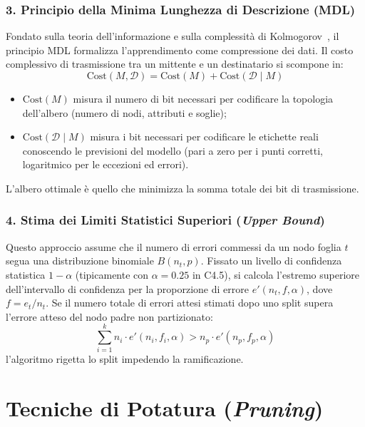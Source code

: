 \subsubsection{3. Principio della Minima Lunghezza di Descrizione (MDL)}
Fondato sulla teoria dell'informazione e sulla complessità di Kolmogorov~\cite{rissanen1978}, il principio MDL formalizza l'apprendimento come compressione dei dati. Il costo complessivo di trasmissione tra un mittente e un destinatario si scompone in:
\begin{equation}
    \text{Cost}(M, \mathcal{D}) = \text{Cost}(M) + \text{Cost}(\mathcal{D} \mid M)
\end{equation}
\begin{itemize}
    \item $\text{Cost}(M)$ misura il numero di bit necessari per codificare la topologia dell'albero (numero di nodi, attributi e soglie);
    \item $\text{Cost}(\mathcal{D} \mid M)$ misura i bit necessari per codificare le etichette reali conoscendo le previsioni del modello (pari a zero per i punti corretti, logaritmico per le eccezioni ed errori).
\end{itemize}
L'albero ottimale è quello che minimizza la somma totale dei bit di trasmissione.

\subsubsection{4. Stima dei Limiti Statistici Superiori (\textit{Upper Bound})}
Questo approccio assume che il numero di errori commessi da un nodo foglia $t$ segua una distribuzione binomiale $B(n_t, p)$. Fissato un livello di confidenza statistica $1 - \alpha$ (tipicamente con $\alpha = 0.25$ in C4.5), si calcola l'estremo superiore dell'intervallo di confidenza per la proporzione di errore $e'(n_t, f, \alpha)$, dove $f = e_t / n_t$.
Se il numero totale di errori attesi stimati dopo uno split supera l'errore atteso del nodo padre non partizionato:
\begin{equation}
    \sum_{i=1}^k n_i \cdot e'(n_i, f_i, \alpha) > n_p \cdot e'(n_p, f_p, \alpha)
\end{equation}
l'algoritmo rigetta lo split impedendo la ramificazione.

\FloatBarrier
\section{Tecniche di Potatura (\textit{Pruning})}
\label{sec:dm-tree-pruning}

